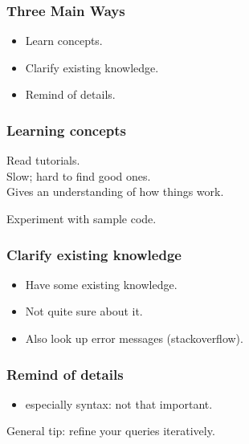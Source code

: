 \begin{frame}
\frametitle{Three Main Ways}

\Large
\begin{changemargin}{1cm}
\begin{itemize}
\item Learn concepts.
\item Clarify existing knowledge.
\item Remind of details.
\end{itemize}
\end{changemargin}
\end{frame}

\begin{frame}
\frametitle{Learning concepts}

\Large
\begin{changemargin}{1cm}
\item Read tutorials.\\
Slow; hard to find good ones.\\
Gives an understanding of how things work.
\item Experiment with sample code.
\end{changemargin}
\end{frame}


\begin{frame}
\frametitle{Clarify existing knowledge}

\begin{changemargin}{1cm}
\Large
\begin{itemize}
\item Have some existing knowledge.
\item Not quite sure about it.
\item Also look up error messages (stackoverflow).
\end{itemize}
\end{changemargin}

\end{frame}

\begin{frame}
\frametitle{Remind of details}

\Large
\begin{changemargin}{1cm}
\begin{itemize}
\item especially syntax: not that important.
\end{itemize}

General tip: refine your queries iteratively.
\end{changemargin}
\end{frame}

